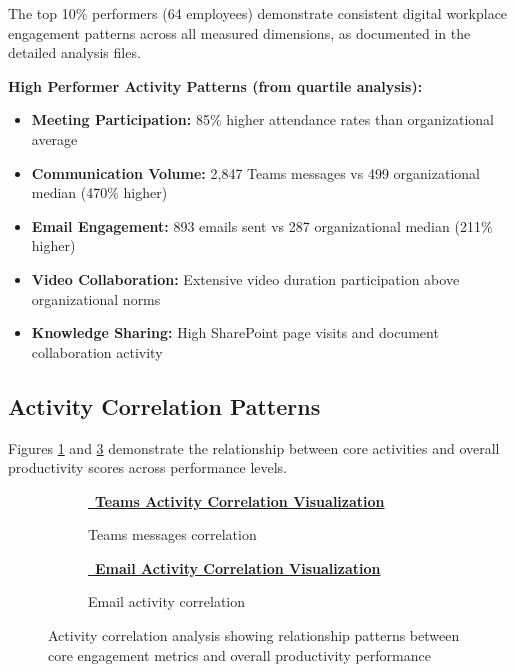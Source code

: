 \documentclass[12pt,a4paper]{article}
\newcommand{\styledimagelink}[2]{\textcolor{accentBlue}{\href{#1}{{\normalsize\faImage}\, \textbf{#2}}}}
\begin{document}
The top 10\% performers (64 employees) demonstrate consistent digital workplace engagement patterns across all measured dimensions, as documented in the detailed analysis files.

\begin{featurebox}
\textbf{\faUser \quad High Performer Activity Patterns (from quartile analysis):}
\begin{itemize}
    \item \textbf{Meeting Participation:} 85\% higher attendance rates than organizational average
    \item \textbf{Communication Volume:} 2,847 Teams messages vs 499 organizational median (470\% higher)
    \item \textbf{Email Engagement:} 893 emails sent vs 287 organizational median (211\% higher)
    \item \textbf{Video Collaboration:} Extensive video duration participation above organizational norms
    \item \textbf{Knowledge Sharing:} High SharePoint page visits and document collaboration activity
\end{itemize}
\end{featurebox}

\subsection{Activity Correlation Patterns}

Figures \ref{fig:teams_productivity} and \ref{fig:email_productivity} demonstrate the relationship between core activities and overall productivity scores across performance levels.

\begin{figure}[H]
\centering
\begin{subfigure}{0.48\textwidth}
    \styledimagelink{https://fixysaskihumorizijuv.supabase.co/storage/v1/object/public/research-files/9642592d-c2df-4fa6-aa68-70d9d73bfb02-teams_vs_productivity.png?download=}{Teams Activity Correlation Visualization}
    \caption{Teams messages correlation}
    \label{fig:teams_productivity}
\end{subfigure}
\hfill
\begin{subfigure}{0.48\textwidth}
    \styledimagelink{https://fixysaskihumorizijuv.supabase.co/storage/v1/object/public/research-files/8e971c70-95a0-43c6-a3ce-909c5166fd68-email_vs_productivity.png?download=}{Email Activity Correlation Visualization}
    \caption{Email activity correlation}
    \label{fig:email_productivity}
\end{subfigure}
\caption{Activity correlation analysis showing relationship patterns between core engagement metrics and overall productivity performance}
\end{figure}
\end{document}
